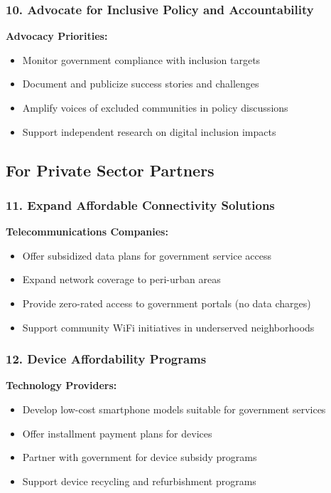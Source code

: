 \documentclass[12pt,a4paper]{article}
\begin{document}
\subsubsection{10. Advocate for Inclusive Policy and Accountability}

\textbf{Advocacy Priorities:}
\begin{itemize}
    \item Monitor government compliance with inclusion targets
    \item Document and publicize success stories and challenges
    \item Amplify voices of excluded communities in policy discussions
    \item Support independent research on digital inclusion impacts
\end{itemize}

\subsection{For Private Sector Partners}

\subsubsection{11. Expand Affordable Connectivity Solutions}

\textbf{Telecommunications Companies:}
\begin{itemize}
    \item Offer subsidized data plans for government service access
    \item Expand network coverage to peri-urban areas
    \item Provide zero-rated access to government portals (no data charges)
    \item Support community WiFi initiatives in underserved neighborhoods
\end{itemize}

\subsubsection{12. Device Affordability Programs}

\textbf{Technology Providers:}
\begin{itemize}
    \item Develop low-cost smartphone models suitable for government services
    \item Offer installment payment plans for devices
    \item Partner with government for device subsidy programs
    \item Support device recycling and refurbishment programs
\end{itemize}
\end{document}

